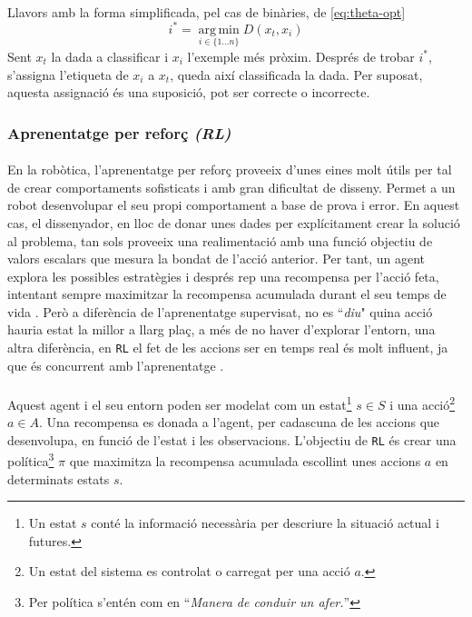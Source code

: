 \documentclass[12pt,a4paper,final,twoside]{article}
\begin{document}
\paragraph{}Llavors amb la forma simplificada, pel cas de binàries, de \eqref{eq:theta-opt}
\begin{equation} \label{eq:theta-opt-exemple}
i^*=\operatorname*{arg\,min}_{i\in\{1\dots n\}} D(x_{t}, x_{i})
\end{equation}
Sent $x_{t}$ la dada a classificar i $x_{i}$ l'exemple més pròxim. Després de trobar $i^*$, s'assigna l'etiqueta de $x_{i}$ a $x_{t}$, queda així classificada la dada. Per suposat, aquesta assignació és una suposició, pot ser correcte o incorrecte.


\subsubsection{Aprenentatge per reforç \textit{(RL)}}

\paragraph{}En la robòtica, l'aprenentatge per reforç proveeix d'unes eines molt útils per tal de crear comportaments sofisticats i amb gran dificultat de disseny. Permet a un robot desenvolupar el seu propi comportament a base de prova i error. En aquest cas, el dissenyador, en lloc de donar unes dades per explícitament crear la solució al problema, tan sols proveeix una realimentació amb una funció objectiu de valors escalars que mesura la bondat de l'acció anterior. Per tant, un agent explora les possibles estratègies i després rep una recompensa per l'acció feta, intentant sempre maximitzar la recompensa acumulada durant el seu temps de vida \cite{Kober2009}. Però a diferència de l'aprenentatge supervisat, no es ``\textit{diu}"  quina acció hauria estat la millor a llarg plaç, a més de no haver d'explorar l'entorn, una altra diferència, en \texttt{RL} el fet de les accions ser en temps real és molt influent, ja que és concurrent amb l'aprenentatge \cite{Kaelbling1996}. 

\paragraph{}Aquest agent i el seu entorn poden ser modelat com un estat\footnote{Un estat $s$ conté la informació necessària per descriure la situació actual i futures.}  $s\in S $ i una acció\footnote{Un estat del sistema es controlat o carregat per una acció $a$.}  $a \in A$. Una recompensa es donada a l'agent, per cadascuna de les accions que desenvolupa, en funció de l'estat i les observacions. L'objectiu de \texttt{RL} és crear una política\footnote{Per política s'entén com en \cite{iec-dlc} ``\textit{Manera de conduir un afer.}''} $\pi$ que maximitza la recompensa acumulada escollint unes accions $a$ en determinats estats $s$.
\end{document}
